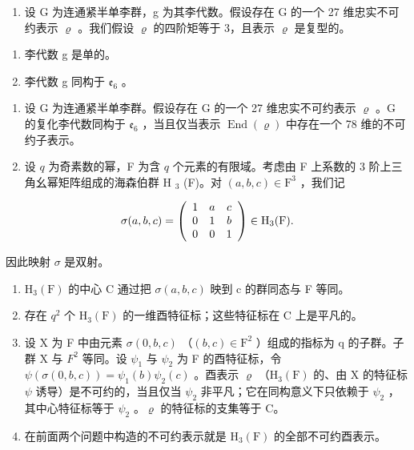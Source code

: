 \begin{enumerate}
\def\labelenumi{\arabic{enumi})}
\setcounter{enumi}{12}
\tightlist
\item
  设 G 为连通紧半单李群，g 为其李代数。假设存在 G 的一个 27 维忠实不可约表示 \(\varrho\) 。我们假设 \(\varrho\) 的四阶矩等于 3，且表示 \(\varrho\) 是复型的。
\end{enumerate}

\begin{enumerate}
\def\labelenumi{\alph{enumi})}
\item
  李代数 g 是单的。
\item
  李代数 g 同构于 \(\mathfrak{e}_{6}\) 。
\end{enumerate}

\begin{enumerate}
\def\labelenumi{\arabic{enumi})}
\setcounter{enumi}{13}
\item
  设 G 为连通紧半单李群。假设存在 G 的一个 27 维忠实不可约表示 \(\varrho\) 。G 的复化李代数同构于 \(\mathfrak{e}_6\) ，当且仅当表示 \(\operatorname{End}(\varrho)\) 中存在一个 78 维的不可约子表示。
\item
  设 \(q\) 为奇素数的幂，F 为含 \(q\) 个元素的有限域。考虑由 F 上系数的 3 阶上三角幺幂矩阵组成的海森伯群 H \(_3\) (F)。对 \((a, b, c) \in \mathrm{F}^3\) ，我们记
\end{enumerate}

\[
\sigma (a, b, c) = \left( \begin{array}{c c c} 1 & a & c \\ 0 & 1 & b \\ 0 & 0 & 1 \end{array} \right) \in \mathrm{H} _ {3} (\mathrm{F}).
\]

因此映射 \(\sigma\) 是双射。

\begin{enumerate}
\def\labelenumi{\alph{enumi})}
\item
  \(\mathrm{H}_{3}(\mathrm{F})\) 的中心 C 通过把 \(\sigma(a,b,c)\) 映到 c 的群同态与 F 等同。
\item
  存在 \(q^{2}\) 个 \(\mathrm{H}_{3}(\mathrm{F})\) 的一维酉特征标；这些特征标在 C 上是平凡的。
\item
  设 X 为 F 中由元素 \(\sigma(0,b,c)\) （\((b,c)\in\mathrm{F}^{2}\) ）组成的指标为 q 的子群。子群 X 与 \(F^{2}\) 等同。设 \(\psi_{1}\) 与 \(\psi_{2}\) 为 F 的酉特征标，令 \(\psi(\sigma(0,b,c))=\psi_{1}(b)\psi_{2}(c)\) 。酉表示 \(\varrho\) （\(\mathrm{H}_{3}(\mathrm{F})\) 的、由 X 的特征标 \(\psi\) 诱导）是不可约的，当且仅当 \(\psi_{2}\) 非平凡；它在同构意义下只依赖于 \(\psi_{2}\) ，其中心特征标等于 \(\psi_{2}\) 。\(\varrho\) 的特征标的支集等于 C。
\item
  在前面两个问题中构造的不可约表示就是 \(\mathrm{H}_{3}(\mathrm{F})\) 的全部不可约酉表示。
\end{enumerate}

